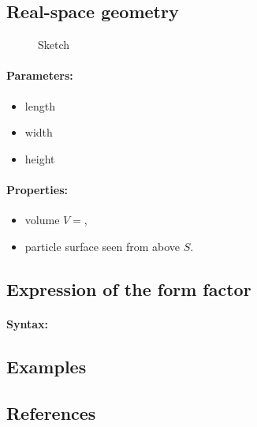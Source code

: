 \subsection{Real-space geometry}


\begin{figure}[ht]
\begin{center}
\caption{Sketch}
\end{center}
\end{figure}

\paragraph{Parameters:}
\begin{itemize}
\item length 
\item width 
\item height 
\end{itemize}

\paragraph{Properties:}
\begin{itemize}
\item volume $V = $,
\item particle surface seen from above $S $.
\end{itemize}

\subsection{Expression of the form factor}

\paragraph{Syntax:} 

\subsection{Examples}



\subsection{References}

